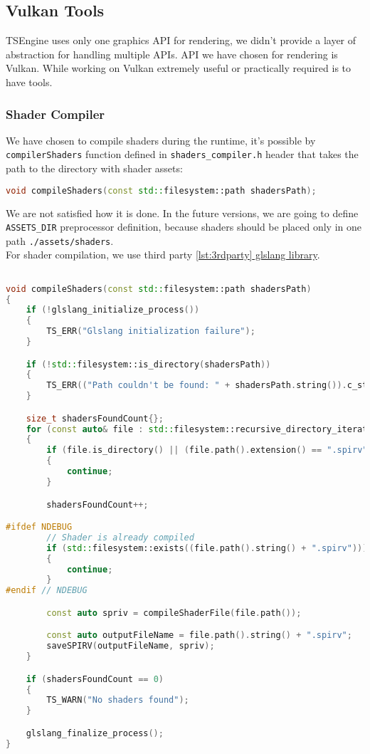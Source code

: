 \newpage
\subsection{Vulkan Tools}
\hspace{\parindent}
TSEngine uses only one graphics API for rendering, we didn't provide a layer of abstraction for handling multiple APIs. API we have chosen for rendering is Vulkan. While working on Vulkan extremely useful or practically required is to have tools.
\subsubsection{Shader Compiler}
\label{sec:shader_compiler}
We have chosen to compile shaders during the runtime, it's possible by \texttt{compilerShaders} function defined in \texttt{shaders\_compiler.h} header that takes the path to the directory with shader assets: 
\begin{lstlisting}[language=c++, caption=Shaders Compiler header (./engine/src/vulkan\_tools/shaders\_compiler.h)]
void compileShaders(const std::filesystem::path shadersPath);
\end{lstlisting}
We are not satisfied how it is done. In the future versions, we are going to define \texttt{ASSETS\_DIR} preprocessor definition, because shaders should be placed only in one path \texttt{./assets/shaders}.\\
For shader compilation, we use third party \hyperref[lst:3rdparty]{\ref*{lst:3rdparty} glslang library}.
\begin{lstlisting}[language=c++, caption=Shader Compiler implementation(./engine/src/vulkan\_tools/shaders\_compiler.cpp)]

void compileShaders(const std::filesystem::path shadersPath)
{
    if (!glslang_initialize_process())
    {
        TS_ERR("Glslang initialization failure");
    }

    if (!std::filesystem::is_directory(shadersPath))
    {
        TS_ERR(("Path couldn't be found: " + shadersPath.string()).c_str());
    }

    size_t shadersFoundCount{};
    for (const auto& file : std::filesystem::recursive_directory_iterator(shadersPath))
    {
        if (file.is_directory() || (file.path().extension() == ".spirv") || (file.path().extension() == ".h"))
        {
            continue;
        }

        shadersFoundCount++;

#ifdef NDEBUG
        // Shader is already compiled
        if (std::filesystem::exists((file.path().string() + ".spirv")))
        {
            continue;
        }
#endif // NDEBUG

        const auto spriv = compileShaderFile(file.path());

        const auto outputFileName = file.path().string() + ".spirv";
        saveSPIRV(outputFileName, spriv);
    }

    if (shadersFoundCount == 0)
    {
        TS_WARN("No shaders found");
    }

    glslang_finalize_process();
}
\end{lstlisting}
